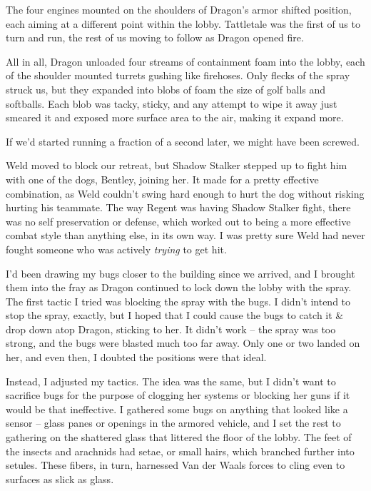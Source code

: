 





The four engines mounted on the shoulders of Dragon's armor shifted position, each aiming at a different point within the lobby.  Tattletale was the first of us to turn and run, the rest of us moving to follow as Dragon opened fire.



All in all, Dragon unloaded four streams of containment foam into the lobby, each of the shoulder mounted turrets  gushing like firehoses.  Only flecks of the spray struck us, but they expanded into blobs of foam the size of golf balls and softballs.  Each blob was tacky, sticky, and any attempt to wipe it away just smeared it and exposed more surface area to the air, making it expand more.



If we'd started running a fraction of a second later, we might have been screwed.



Weld moved to block our retreat, but Shadow Stalker stepped up to fight him with one of the dogs, Bentley, joining her.  It made for a pretty effective combination, as Weld couldn't swing hard enough to hurt the dog without risking hurting his teammate.  The way Regent was having Shadow Stalker fight, there was no self preservation or defense, which worked out to being a more effective combat style than anything else, in its own way.  I was pretty sure Weld had never fought someone who was actively \emph{trying} to get hit.



I'd been drawing my bugs closer to the building since we arrived, and I brought them into the fray as Dragon continued to lock down the lobby with the spray.  The first tactic I tried was blocking the spray with the bugs.  I didn't intend to stop the spray, exactly, but I hoped that I could cause the bugs to catch it & drop down atop Dragon, sticking to her.  It didn't work – the spray was too strong, and the bugs were blasted much too far away.  Only one or two landed on her, and even then, I doubted the positions were that ideal.



Instead, I adjusted my tactics.  The idea was the same, but I didn't want to sacrifice bugs for the purpose of clogging her systems or blocking her guns if it would be that ineffective.  I gathered some bugs on anything that looked like a sensor – glass panes or openings in the armored vehicle, and I set the rest to gathering on the shattered glass that littered the floor of the lobby.  The feet of the insects and arachnids had setae, or small hairs, which branched further into setules.  These fibers, in turn, harnessed Van der Waals forces to cling even to surfaces as slick as glass.



